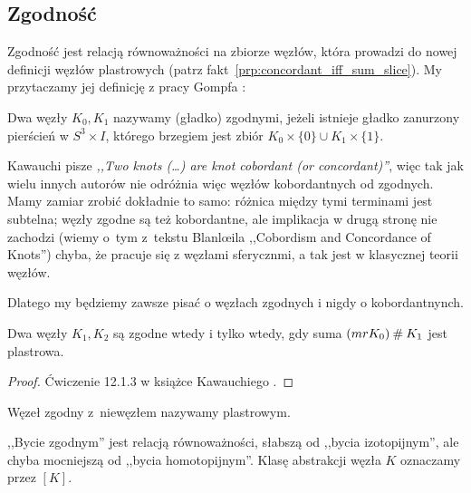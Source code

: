 
\subsection{Zgodność}
Zgodność jest relacją równoważności na zbiorze węzłów, która prowadzi do nowej definicji węzłów plastrowych (patrz fakt~\ref{prp:concordant_iff_sum_slice}).
My przytaczamy jej definicję z pracy Gompfa \cite{gompf1986}:

\begin{definition}[zgodność]
%
%
    Dwa węzły $K_0, K_1$ nazywamy (gładko) zgodnymi, jeżeli istnieje gładko zanurzony pierścień w $S^3 \times I$, którego brzegiem jest zbiór $K_0 \times \{0\} \cup K_1 \times \{1\}$.
\end{definition}

Kawauchi \cite[s. 156]{kawauchi1996} pisze \emph{,,Two knots (…) are knot cobordant (or concordant)''}, więc tak jak wielu innych autorów nie odróżnia więc węzłów kobordantnych od zgodnych.
Mamy zamiar zrobić dokładnie to samo: różnica między tymi terminami jest subtelna; węzły zgodne są też kobordantne, ale implikacja w drugą stronę nie zachodzi (wiemy o~tym z~tekstu Blanlœila ,,Cobordism and Concordance of Knots'') chyba, że pracuje się z węzłami sferycznmi, a tak jest w klasycznej teorii węzłów.
%

Dlatego my będziemy zawsze pisać o węzłach zgodnych i nigdy o kobordantnynch.

\begin{proposition}
\label{prp:concordant_iff_sum_slice}%
    Dwa węzły $K_1, K_2$ są zgodne wtedy i tylko wtedy, gdy suma $(mr K_0) \mathbin{\#} K_1$ jest plastrowa.
\end{proposition}

\begin{proof}
    Ćwiczenie 12.1.3 w książce Kawauchiego \cite{kawauchi1996}.
\end{proof}

\begin{definition}
    Węzeł zgodny z~niewęzłem nazywamy plastrowym.
\end{definition}

,,Bycie zgodnym'' jest relacją równoważności, słabszą od ,,bycia izotopijnym'', ale chyba mocniejszą od ,,bycia homotopijnym''.
Klasę abstrakcji węzła $K$ oznaczamy przez $[K]$.

